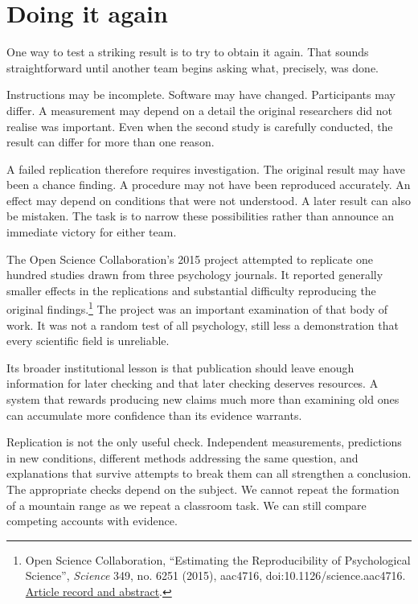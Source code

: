 \documentclass[12pt,a4paper]{book}
\begin{document}
\section*{Doing it again}

One way to test a striking result is to try to obtain it again. That sounds straightforward until another team begins asking what, precisely, was done.

Instructions may be incomplete. Software may have changed. Participants may differ. A measurement may depend on a detail the original researchers did not realise was important. Even when the second study is carefully conducted, the result can differ for more than one reason.

A failed replication therefore requires investigation. The original result may have been a chance finding. A procedure may not have been reproduced accurately. An effect may depend on conditions that were not understood. A later result can also be mistaken. The task is to narrow these possibilities rather than announce an immediate victory for either team.

The Open Science Collaboration's 2015 project attempted to replicate one hundred studies drawn from three psychology journals. It reported generally smaller effects in the replications and substantial difficulty reproducing the original findings.\footnote{Open Science Collaboration, ``Estimating the Reproducibility of Psychological Science'', \emph{Science} 349, no. 6251 (2015), aac4716, doi:10.1126/science.aac4716. \href{https://pubmed.ncbi.nlm.nih.gov/26315443/}{Article record and abstract}.} The project was an important examination of that body of work. It was not a random test of all psychology, still less a demonstration that every scientific field is unreliable.

Its broader institutional lesson is that publication should leave enough information for later checking and that later checking deserves resources. A system that rewards producing new claims much more than examining old ones can accumulate more confidence than its evidence warrants.

Replication is not the only useful check. Independent measurements, predictions in new conditions, different methods addressing the same question, and explanations that survive attempts to break them can all strengthen a conclusion. The appropriate checks depend on the subject. We cannot repeat the formation of a mountain range as we repeat a classroom task. We can still compare competing accounts with evidence.
\end{document}

